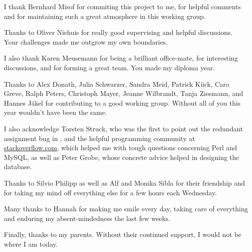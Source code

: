 I thank Bernhard Misof for commiting this project to me, for helpful comments
and for maintaining such a great atmosphere in this working group.

Thanks to Oliver Niehuis for really good supervising and helpful discussions.
Your challenges made me outgrow my own boundaries.

I also thank Karen Meusemann for being a brilliant office-mate, for interesting
discussions, and for forming a great team. You made my diploma year.

Thanks to Alex Donath, Julia Schwarzer, Sandra Meid, Patrick Kück, Caro Greve,
Ralph Peters, Christoph Mayer, Jeanne Wilbrandt, Tanja Ziesmann, and Hannes
Jäkel for contributing to a good working group. Without all of you this year
wouldn't have been the same.

I also acknowledge Torsten Struck, who was the first to point out the redundant
assignment bug in \hamstr, and the helpful programming community at
\url{stackoverflow.com}, which helped me with tough questions concerning Perl
and MySQL, as well as Peter Grobe, whose concrete advice helped in designing the
database.

Thanks to Silvio Philipp as well as Alf and Monika Sibla for their friendship
and for taking my mind off everything else for a few hours each Wednesday. 

Many thanks to Hannah for making me smile every day, taking care of everything
and enduring my absent-mindedness the last few weeks. 

Finally, thanks to my parents. Without their continued support, I would not be
where I am today.
